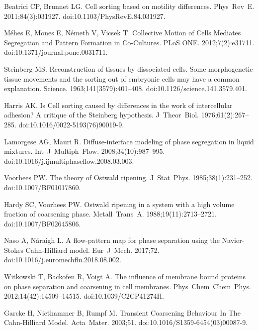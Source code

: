 \documentclass[10pt,letterpaper]{article}
\begin{document}
\begin{thebibliography}{10}
Beatrici CP, Brunnet LG.
\newblock Cell sorting based on motility differences.
\newblock Phys~Rev~E. 2011;84(3):031927.
\newblock doi:{10.1103/PhysRevE.84.031927}.

M\'{e}hes E, Mones E, N\'{e}meth V, Vicsek T.
\newblock Collective Motion of Cells Mediates Segregation and Pattern Formation
  in Co-Cultures.
\newblock PLoS ONE. 2012;7(2):e31711.
\newblock doi:{10.1371/journal.pone.0031711}.

Steinberg MS.
\newblock Reconstruction of tissues by dissociated cells. {Some} morphogenetic
  tissue movements and the sorting out of embryonic cells may have a common
  explanation.
\newblock Science. 1963;141(3579):401--408.
\newblock doi:{10.1126/science.141.3579.401}.

Harris AK.
\newblock Is Cell sorting caused by differences in the work of intercellular
  adhesion? A critique of the Steinberg hypothesis.
\newblock J~Theor~Biol. 1976;61(2):267--285.
\newblock doi:{10.1016/0022-5193(76)90019-9}.

Lamorgese AG, Mauri R.
\newblock Diffuse-interface modeling of phase segregation in liquid mixtures.
\newblock Int~J~Multiph~Flow. 2008;34(10):987--995.
\newblock doi:{10.1016/j.ijmultiphaseflow.2008.03.003}.

Voorhees PW.
\newblock The theory of Ostwald ripening.
\newblock J~Stat~Phys. 1985;38(1):231--252.
\newblock doi:{10.1007/BF01017860}.

Hardy SC, Voorhees PW.
\newblock Ostwald ripening in a system with a high volume fraction of
  coarsening phase.
\newblock Metall~Trans~A. 1988;19(11):2713--2721.
\newblock doi:{10.1007/BF02645806}.

Naso A, Náraigh L.
\newblock A flow-pattern map for phase separation using the Navier-Stokes
  Cahn-Hilliard model.
\newblock Eur~J~Mech. 2017;72.
\newblock doi:{10.1016/j.euromechflu.2018.08.002}.

Witkowski T, Backofen R, Voigt A.
\newblock The influence of membrane bound proteins on phase separation and
  coarsening in cell membranes.
\newblock Phys~Chem~Chem~Phys. 2012;14(42):14509--14515.
\newblock doi:{10.1039/C2CP41274H}.

Garcke H, Niethammer B, Rumpf M.
\newblock Transient Coarsening Behaviour In The Cahn-Hilliard Model.
\newblock Acta~Mater. 2003;51.
\newblock doi:{10.1016/S1359-6454(03)00087-9}.


\end{thebibliography}
\end{document}
